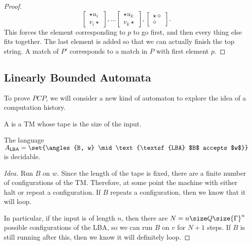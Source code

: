 \documentclass{standalone}
\begin{document}
\begin{proof}
\[{      \begin{bmatrix} \star u_i \\ v_i \star \end{bmatrix}, \dots
      \begin{bmatrix} \star u_k \\ v_k \star \end{bmatrix},
      \begin{bmatrix} \star \diamond \\ \diamond \end{bmatrix}
    }.
  \]
  This forces the element corresponding to \(p\) to go first, and then every thing else fits together. The last element is added so that we can actually finish the top string. A match of \(P'\) corresponds to a match in \(P\) with first element \(p\).
\end{proof}

\subsection{Linearly Bounded Automata}
To prove \(\mathit{PCP}\), we will consider a new kind of automaton to explore the idea of a computation history.
\begin{definition}
  A  is a \textsf{TM} whose tape is the size of the input.
\end{definition}
\begin{proposition}
  The language \(A_{\textsf{LBA}} = \set{\angles{B, w} \mid \text{\textsf{LBA} $B$ accepts $w$}}\) is decidable.
\end{proposition}
\begin{proof}[Idea]
  Run \(B\) on \(w\). Since the length of the tape is fixed, there are a finite number of configurations of the \textsf{TM}. Therefore, at some point the machine with either halt or repeat a configuration. If \(B\) repeats a configuration, then we know that it will loop.

  In particular, if the input is of length \(n\), then there are \(N = n \size Q \size{\Gamma}^n\) possible configurations of the \textsf{LBA}, so we can run \(B\) on \(v\) for \(N + 1\) steps. If \(B\) is still running after this, then we know it will definitely loop.
\end{proof}
\end{document}
